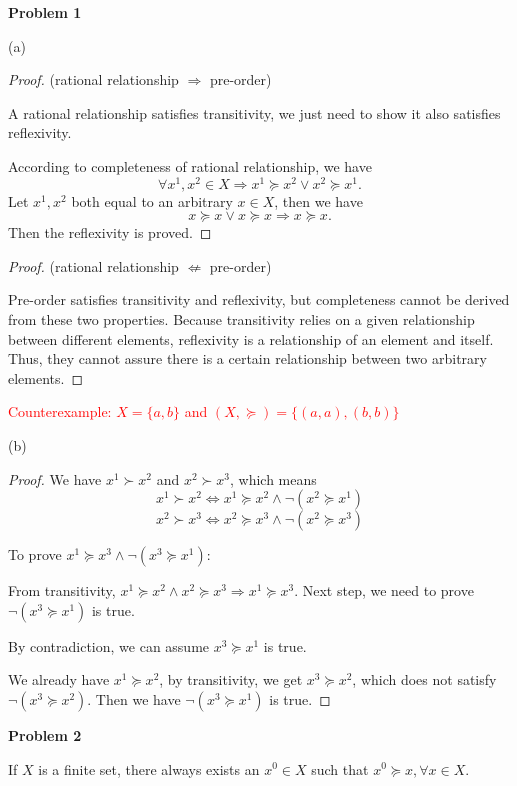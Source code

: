 \documentclass[letterpaper, 11pt]{article}
\newcommand{\1}{\mathds{1}}	%
\theoremstyle{definition}
\begin{document}
\textbf{Problem 1}

(a)

\begin{proof}
  (rational relationship $\Rightarrow$ pre-order)

  A rational relationship satisfies transitivity, we just need to show it also satisfies reflexivity.

  According to completeness of rational relationship, we have \[
    \forall x^1, x^2 \in X \Longrightarrow x^1 \succeq x^2 \vee x^2 \succeq x^1.
  \]
  Let $x^1,x^2$ both equal to an arbitrary $x \in X$, then we have \[
    x \succeq x \vee x \succeq x \Longrightarrow x \succeq x.
  \]
  Then the reflexivity is proved.
\end{proof}

\begin{proof}
  (rational relationship $\nLeftarrow$ pre-order)

  Pre-order satisfies transitivity and reflexivity, but completeness cannot be derived from these two properties. Because transitivity relies on a given relationship between different elements, reflexivity is a relationship of an element and itself. Thus, they cannot assure there is a certain relationship between two arbitrary elements.
\end{proof}
\textcolor{red}{
  Counterexample: 
  $X = \{a, b\}$ and $(X, \succeq) = \{(a,a), (b,b)\}$
}

(b)


\begin{proof}
  We have $x^1 \succ x^2$ and $x^2 \succ x^3$, which means
  \[
    x^1 \succ x^2 \iff x^1 \succeq x^2 \wedge \neg (x^2 \succeq x^1)
  \]
  \[
    x^2 \succ x^3 \iff x^2 \succeq x^3 \wedge \neg (x^2 \succeq x^3)
  \]

  To prove $x^1 \succeq x^3 \wedge \neg (x^3 \succeq x^1)$:

  From transitivity, $x^1 \succeq x^2 \wedge x^2 \succeq x^3 \Longrightarrow  x^1 \succeq x^3$. Next step, we need to prove $\neg (x^3 \succeq x^1)$ is true.

  By contradiction, we can assume $x^3 \succeq x^1$ is true.

  We already have $x^1 \succeq x^2$, by transitivity, we get $x^3 \succeq x^2$, which does not satisfy $\neg (x^3 \succeq x^2)$. Then we have $\neg (x^3 \succeq x^1)$ is true.
\end{proof}

\textbf{Problem 2}

If $X$ is a finite set, there always exists an $x^0 \in X$ such that $x^0 \succeq x, \forall x \in X$.
\end{document}
